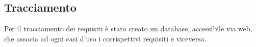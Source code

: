 \subsection{Tracciamento}
Per il tracciamento dei requisiti è stato creato un database, accessibile via web, che associa ad ogni casi d'uso i corrispettivi requisiti e viceversa.